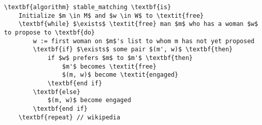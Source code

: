 \begin{lstlisting}
\textbf{algorithm} stable_matching \textbf{is}
    Initialize $m \in M$ and $w \in W$ to \textit{free}
    \textbf{while} $\exists$ \textit{free} man $m$ who has a woman $w$ to propose to \textbf{do}
        w := first woman on $m$'s list to whom m has not yet proposed
        \textbf{if} $\exists$ some pair $(m', w)$ \textbf{then}
            if $w$ prefers $m$ to $m'$ \textbf{then}
                $m'$ becomes \textit{free}
                $(m, w)$ become \textit{engaged}
            \textbf{end if}
        \textbf{else}
            $(m, w)$ become engaged
        \textbf{end if}
    \textbf{repeat} // wikipedia
\end{lstlisting}
